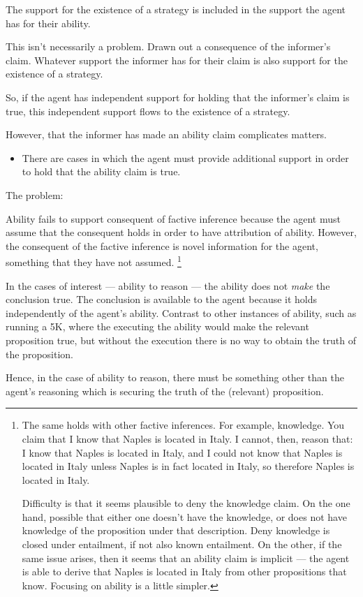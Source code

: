 \documentclass[10pt]{article}
\begin{document}
\begin{note}[Endorsed]
  
\end{note}


The support for the existence of a strategy is included in the support the agent has for their ability.

This isn't necessarily a problem.
Drawn out a consequence of the informer's claim.
Whatever support the informer has for their claim is also support for the existence of a strategy.

So, if the agent has independent support for holding that the informer's claim is true, this independent support flows to the existence of a strategy.

However, that the informer has made an ability claim complicates matters.


\begin{itemize}
\item There are cases in which the agent must provide additional support in order to hold that the ability claim is true.
\end{itemize}

The problem:

Ability fails to support consequent of factive inference because the agent must assume that the consequent holds in order to have attribution of ability.
However, the consequent of the factive inference is novel information for the agent, something that they have not assumed.\nolinebreak
\footnote{
  The same holds with other factive inferences.
  For example, knowledge.
  You claim that I know that Naples is located in Italy.
  I cannot, then, reason that:
  I know that Naples is located in Italy, and I could not know that Naples is located in Italy unless Naples is in fact located in Italy, so therefore Naples is located in Italy.

  Difficulty is that it seems plausible to deny the knowledge claim.
  On the one hand, possible that either one doesn't have the knowledge, or does not have knowledge of the proposition under that description.
  Deny knowledge is closed under entailment, if not also known entailment.
  On the other, if the same issue arises, then it seems that an ability claim is implicit --- the agent is able to derive that Naples is located in Italy from other propositions that know.
  Focusing on ability is a little simpler.
}

\begin{note}
  In the cases of interest --- ability to reason --- the ability does not \emph{make} the conclusion true.
  The conclusion is available to the agent because it holds independently of the agent's ability.
  Contrast to other instances of ability, such as running a 5K, where the executing the ability would make the relevant proposition true, but without the execution there is no way to obtain the truth of the proposition.

  Hence, in the case of ability to reason, there must be something other than the agent's reasoning which is securing the truth of the (relevant) proposition.
\end{note}
\end{document}
